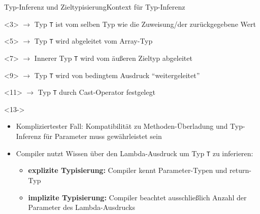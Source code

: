 \begin{frame}[fragile]{Typ-Inferenz und Zieltypisierung}{Kontext für Typ-Inferenz}
    \begin{onlyenv}<3>
        $\rightarrow$ Typ \texttt{T} ist vom selben Typ wie die Zuweisung/der 
        zurückgegebene Wert
    \end{onlyenv}
    \begin{onlyenv}<5>
        $\rightarrow$ Typ \texttt{T} wird abgeleitet vom Array-Typ
    \end{onlyenv}
    \begin{onlyenv}<7>
        $\rightarrow$ Innerer Typ \texttt{T} wird vom äußeren Zieltyp abgeleitet 
    \end{onlyenv}
    \begin{onlyenv}<9>
        $\rightarrow$ Typ \texttt{T} wird von bedingtem Ausdruck \enquote{weitergeleitet}
    \end{onlyenv}
    \begin{onlyenv}<11>
        $\rightarrow$ Typ \texttt{T} durch Cast-Operator festgelegt
    \end{onlyenv}
    \begin{onlyenv}<13->
        \begin{itemize}
            \item<13-> Kompliziertester Fall: Kompatibilität zu Methoden-Überladung und Typ-Inferenz 
            für Parameter muss gewährleistet sein\\
            \item<14-> Compiler nutzt Wissen über den Lambda-Ausdruck um Typ \texttt{T} zu
            inferieren:
            \begin{itemize}
                \item<15-> \textbf{explizite Typisierung:} Compiler kennt Parameter-Typen und 
                return-Typ
                \item<16-> \textbf{implizite Typisierung:} Compiler beachtet ausschließlich 
                Anzahl der Parameter des Lambda-Ausdrucks
            \end{itemize}
        \end{itemize}
    \end{onlyenv}
\end{frame}

